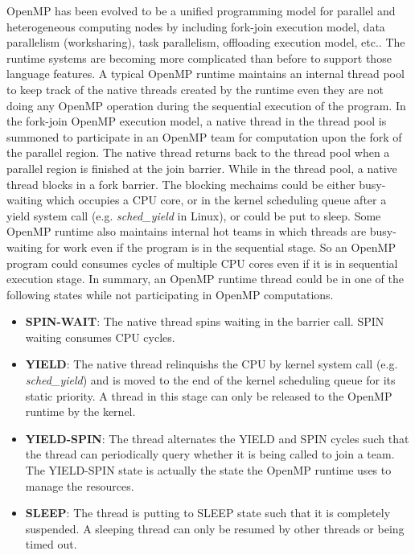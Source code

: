 OpenMP has been evolved to be a unified programming model for 
parallel and heterogeneous computing nodes by including fork-join execution model, 
data parallelism (worksharing), task parallelism, offloading execution model, etc.. 
The runtime systems are becoming more complicated than before to support those language features.
A typical OpenMP runtime maintains 
an internal thread pool to keep track of the native threads created by the runtime even they are not  
doing any OpenMP operation during the sequential execution of the program. 
In the fork-join OpenMP execution model, a native thread in the thread pool 
is summoned to participate in an OpenMP team for computation upon the fork of the {\sf parallel} region. 
The native thread returns back to the thread pool when a parallel 
region is finished at the join barrier. While in the 
thread pool, a native thread blocks in a fork barrier. The blocking mechaims could be  
either busy-waiting which occupies a CPU core, or in the kernel
scheduling queue after a yield system call (e.g. {\em sched\_yield} in Linux), or could be put to sleep. 
Some OpenMP runtime also maintains
internal hot teams in which threads are busy-waiting for work even if the program is in the sequential stage. 
So an OpenMP program could consumes cycles of multiple CPU cores even if it is in sequential execution stage. In summary, an OpenMP runtime 
thread could be in one of the following states while not participating in OpenMP computations.  
\begin{itemize}
	\item {\bf SPIN-WAIT}: The native thread spins waiting in the barrier call. 
		SPIN waiting consumes CPU cycles.
	\item {\bf YIELD}: The native thread relinquishs the CPU by kernel system call (e.g. {\em sched\_yield}) 
		and is moved to the end of the kernel scheduling queue for its static priority. A thread in this 
		stage can only be released to the OpenMP runtime by the kernel. 
	\item {\bf YIELD-SPIN}: The thread alternates the YIELD and SPIN cycles such that the thread can 
		periodically query whether it is being called to join a team. The YIELD-SPIN state is actually the 
		state the OpenMP runtime uses to manage the resources. 
	\item {\bf SLEEP}: The thread is putting to SLEEP state such that it is completely suspended. A sleeping
		thread can only be resumed by other threads or being timed out. 
\end{itemize}
